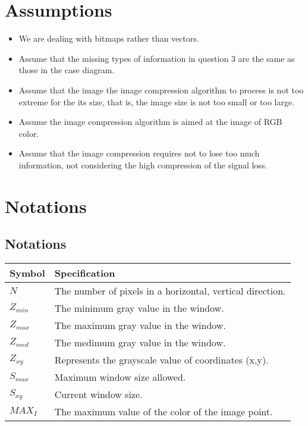 \documentclass{mcmthesis}
\begin{document}
\section{Assumptions}
\begin{itemize}
  \item We are dealing with bitmaps rather than vectors.
  \item Assume that the missing types of information in question 3 are the same as those in the case diagram.
  \item Assume that the image the image compression algorithm to process is not too extreme for the its size, that is, the image size is not too small or too large.
  \item Assume the image compression algorithm is aimed at the image of RGB color.
  \item Assume that the image compression requires not to lose too much information, not considering the high compression of the signal loss.
\end{itemize}

\section{Notations}

\subsection{Notations}
\begin{table}[htb]
\centering

\begin{tabular}{ll} 
\toprule

Symbol & Specification \\
\toprule
$N$  &  The number of pixels in a horizontal, vertical direction. \\

$Z_{min}$ & The minimum gray value in the window. \\

$Z_{max}$ & The maximum gray value in the window. \\

$Z_{med}$ & The medimum gray value in the window. \\

$Z_{xy}$  & Represents the grayscale value of coordinates (x,y). \\

$S_{max}$ & Maximum window size allowed. \\

$S_{xy}$  & Current window size. \\

$MAX_I$ & The maximum value of the color of the image point. \\


\bottomrule
\end{tabular}
\end{table}
\end{document}
